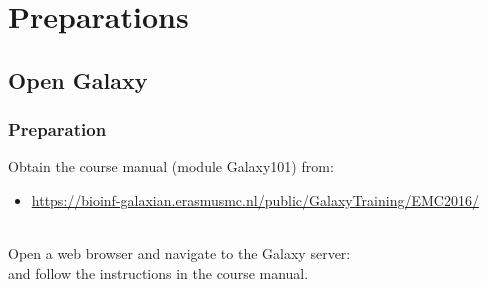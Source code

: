 \section*{Preparations}
\subsection*{Open Galaxy}
\begin{frame}
\frametitle{Preparation}
Obtain the course manual (module Galaxy101) from:
\begin{itemize}
	\item \url{https://bioinf-galaxian.erasmusmc.nl/public/GalaxyTraining/EMC2016/}
\end{itemize}

\ \\
Open a web browser and navigate to the Galaxy server:
\servers
\ \\
and follow the instructions in the course manual.
\end{frame}
